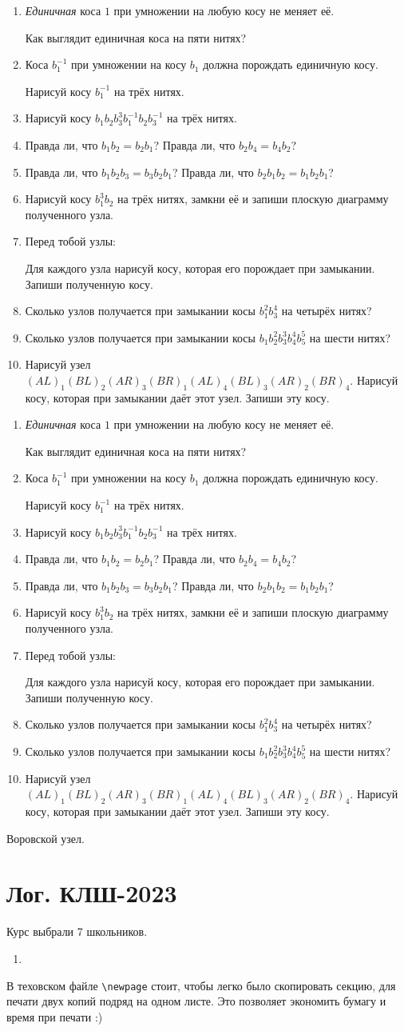 \documentclass[12pt]{article}
\theoremstyle{definition}
\begin{document}
\newcommand{\daytwo}{
\begin{enumerate}
\item  \textit{Единичная} коса $1$ при умножении на любую косу не меняет её.

Как выглядит единичная коса на пяти нитях?
\item Коса $b_1^{-1}$ при умножении на косу $b_1$ должна порождать единичную косу.

Нарисуй косу $b_1^{-1}$ на трёх нитях.
\item Нарисуй косу $b_1 b_2 b_3^3 b_1^{-1} b_2 b_3^{-1}$ на трёх нитях.
\item Правда ли, что $b_1 b_2 = b_2 b_1$? Правда ли, что $b_2 b_4 = b_4 b_2$?
\item Правда ли, что $b_1 b_2 b_3 = b_3 b_2 b_1$? Правда ли, что $b_2 b_1 b_2 = b_1 b_2 b_1$?
\item Нарисуй косу $b_1^3 b_2$ на трёх нитях, замкни её и запиши плоскую диаграмму полученного узла.
\item Перед тобой узлы:



Для каждого узла нарисуй косу, которая его порождает при замыкании. 
Запиши полученную косу.
\item Сколько узлов получается при замыкании косы $b_1^2 b_3^4$ на четырёх нитях?
\item Сколько узлов получается при замыкании косы $b_1 b_2^2 b_3^3 b_4^4 b_5^5$ на шести нитях?
\item Нарисуй узел $(AL)_1 (BL)_2 (AR)_3 (BR)_1 (AL)_4 (BL)_3 (AR)_2 (BR)_4$.
Нарисуй косу, которая при замыкании даёт этот узел. Запиши эту косу. 
\end{enumerate}
}

\newpage
\daytwo
\vfill
\daytwo

\newpage

Воровской узел. 




\newpage

\section{Лог. КЛШ-2023}

Курс выбрали 7 школьников.

\begin{enumerate}
  \item 
\end{enumerate}

В теховском файле \verb|\newpage| стоит, чтобы легко было скопировать секцию, для печати двух копий подряд на одном листе.
Это позволяет экономить бумагу и время при печати :)
\end{document}
